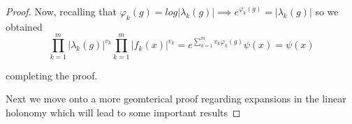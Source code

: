 \begin{proof}
    Now, recalling that $ \varphi_k(g) = log|\lambda_k(g)| \implies
        e^{\varphi_k(g)}= |\lambda_k(g)|$ so we obtained
    \[ \prod_{k=1}^{m}|\lambda_k(g)|^{v_k}\prod_{k=1}^{m}|f_k(x)|^{v_k} = e^{\sum_{k=1}^{m}v_k\varphi_k(g)}\psi(x) = \psi(x)\]

    completing the proof.

    Next we move onto a more geomterical proof regarding expansions in the linear
    holonomy which will lead to some important results
\end{proof}